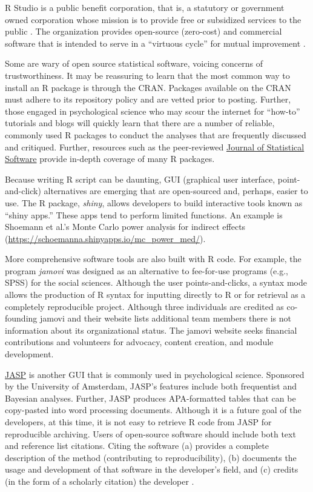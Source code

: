 \documentclass[
  11pt,
]{book}
\begin{document}
R Studio is a public benefit corporation, that is, a statutory or government owned corporation whose mission is to provide free or subsidized services to the public \citep{noauthor_rstudio_2022}. The organization provides open-source (zero-cost) and commercial software that is intended to serve in a ``virtuous cycle'' for mutual improvement \citep{noauthor_rstudio_2022}.

Some are wary of open source statistical software, voicing concerns of trustworthiness. It may be reassuring to learn that the most common way to install an R package is through the CRAN. Packages available on the CRAN must adhere to its repository policy and are vetted prior to posting. Further, those engaged in psychological science who may scour the internet for ``how-to'' tutorials and blogs will quickly learn that there are a number of reliable, commonly used R packages to conduct the analyses that are frequently discussed and critiqued. Further, resources such as the peer-reviewed \href{https://www.jstatsoft.org/index}{Journal of Statistical Software} provide in-depth coverage of many R packages.

Because writing R script can be daunting, GUI (graphical user interface, point-and-click) alternatives are emerging that are open-sourced and, perhaps, easier to use. The R package, \emph{shiny}, allows developers to build interactive tools known as ``shiny apps.'' These apps tend to perform limited functions. An example is Shoemann et al.'s \citeyearpar{shoemann_determining_2017} Monte Carlo power analysis for indirect effects (\url{https://schoemanna.shinyapps.io/mc_power_med/}).

More comprehensive software tools are also built with R code. For example, the program \emph{jamovi} \citep{the_jamovi_project_about_2021} was designed as an alternative to fee-for-use programs (e.g., SPSS) for the social sciences. Although the user points-and-clicks, a syntax mode allows the production of R syntax for inputting directly to R or for retrieval as a completely reproducible project. Although three individuals are credited as co-founding jamovi and their website lists additional team members \citep{the_jamovi_project_about_2021} there is not information about its organizational status. The jamovi website seeks financial contributions and volunteers for advocacy, content creation, and module development.

\href{https://jasp-stats.org/}{JASP} \citep[``just another statistics program'',][]{jasp_team_jasp_2022} is another GUI that is commonly used in psychological science. Sponsored by the University of Amsterdam, JASP's features include both frequentist and Bayesian analyses. Further, JASP produces APA-formatted tables that can be copy-pasted into word processing documents. Although it is a future goal of the developers, at this time, it is not easy to retrieve R code from JASP for reproducible archiving.
Users of open-source software should include both text and reference list citations. Citing the software (a) provides a complete description of the method (contributing to reproducibility), (b) documents the usage and development of that software in the developer's field, and (c) credits (in the form of a scholarly citation) the developer \citep{smith_software_2016}.
\end{document}
